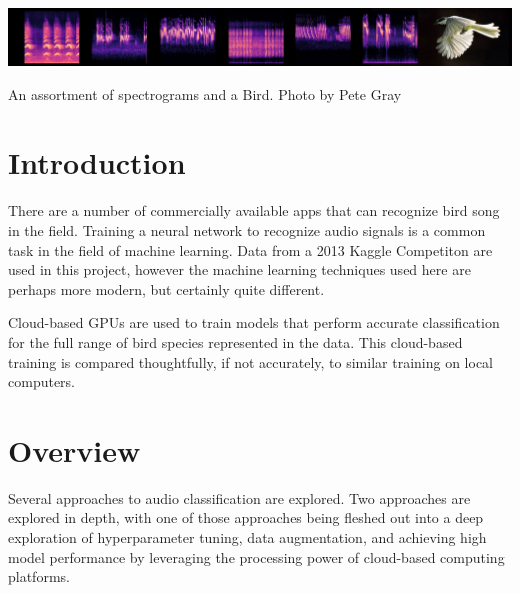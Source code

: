\documentclass[sigconf]{acmart}
\begin{document}
\begin{teaserfigure}
  \includegraphics[width=\textwidth]{spectrograms-and-bird}
  \caption{An assortment of spectrograms and a Bird. Photo by Pete Gray}
  \label{fig:teaser}
\end{teaserfigure}

\maketitle

\section{Introduction}
There are a number of commercially available apps that can 
recognize bird song in the field. Training a neural network to 
recognize audio signals is a common task in the field of
machine learning. Data from a 2013 Kaggle Competiton  \cite{Kaggle13} are
used in this project, however the machine learning techniques
used here are perhaps more modern, but certainly quite different.

Cloud-based GPUs are used
to train models that perform accurate classification for the full
range of bird species represented in the data. This cloud-based
training is compared thoughtfully, if not accurately, to similar
training on local computers.

\section{Overview}
Several approaches to audio classification are explored. Two approaches
are explored in depth, with one of those approaches being fleshed out
into a deep exploration of hyperparameter tuning, data augmentation, and
achieving high model performance by leveraging the processing power of
cloud-based computing platforms.
\end{document}
